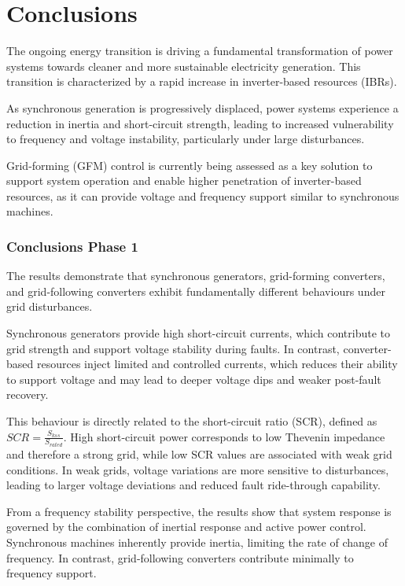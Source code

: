 \chapter{Conclusions}
\label{ch:Conclusions}



The ongoing energy transition is driving a fundamental transformation of power systems towards cleaner and more sustainable electricity generation. This transition is characterized by a rapid increase in inverter-based resources (IBRs).

As synchronous generation is progressively displaced, power systems experience a reduction in inertia and short-circuit strength, leading to increased vulnerability to frequency and voltage instability, particularly under large disturbances.

Grid-forming (GFM) control is currently being assessed as a key solution to support system operation and enable higher penetration of inverter-based resources, as it can provide voltage and frequency support similar to synchronous machines.

\subsection*{Conclusions Phase 1}

The results demonstrate that synchronous generators, grid-forming converters, and grid-following converters exhibit fundamentally different behaviours under grid disturbances.

Synchronous generators provide high short-circuit currents, which contribute to grid strength and support voltage stability during faults. In contrast, converter-based resources inject limited and controlled currents, which reduces their ability to support voltage and may lead to deeper voltage dips and weaker post-fault recovery.

This behaviour is directly related to the short-circuit ratio (SCR), defined as $SCR = \frac{S_{kss}}{S_{rated}}$. High short-circuit power corresponds to low Thevenin impedance and therefore a strong grid, while low SCR values are associated with weak grid conditions. In weak grids, voltage variations are more sensitive to disturbances, leading to larger voltage deviations and reduced fault ride-through capability.

From a frequency stability perspective, the results show that system response is governed by the combination of inertial response and active power control. Synchronous machines inherently provide inertia, limiting the rate of change of frequency. In contrast, grid-following converters contribute minimally to frequency support.

